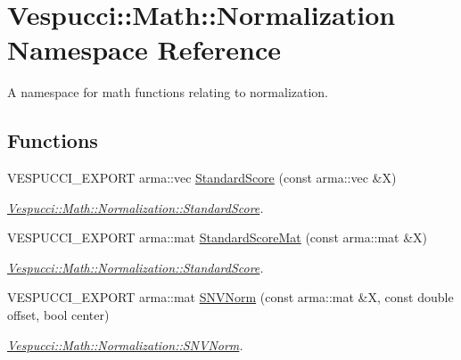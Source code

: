 \hypertarget{namespace_vespucci_1_1_math_1_1_normalization}{}\section{Vespucci\+:\+:Math\+:\+:Normalization Namespace Reference}
\label{namespace_vespucci_1_1_math_1_1_normalization}


A namespace for math functions relating to normalization.  


\subsection*{Functions}
\begin{DoxyCompactItemize}
\item 
V\+E\+S\+P\+U\+C\+C\+I\+\_\+\+E\+X\+P\+O\+RT arma\+::vec \hyperlink{namespace_vespucci_1_1_math_1_1_normalization_a8a39e3540561860b69ec95d8d33bfac0}{Standard\+Score} (const arma\+::vec \&X)
\begin{DoxyCompactList}\small\item\em \hyperlink{namespace_vespucci_1_1_math_1_1_normalization_a8a39e3540561860b69ec95d8d33bfac0}{Vespucci\+::\+Math\+::\+Normalization\+::\+Standard\+Score}. \end{DoxyCompactList}\item 
V\+E\+S\+P\+U\+C\+C\+I\+\_\+\+E\+X\+P\+O\+RT arma\+::mat \hyperlink{namespace_vespucci_1_1_math_1_1_normalization_a00d08eef3567d3420e40dda235c38590}{Standard\+Score\+Mat} (const arma\+::mat \&X)
\begin{DoxyCompactList}\small\item\em \hyperlink{namespace_vespucci_1_1_math_1_1_normalization_a8a39e3540561860b69ec95d8d33bfac0}{Vespucci\+::\+Math\+::\+Normalization\+::\+Standard\+Score}. \end{DoxyCompactList}\item 
V\+E\+S\+P\+U\+C\+C\+I\+\_\+\+E\+X\+P\+O\+RT arma\+::mat \hyperlink{namespace_vespucci_1_1_math_1_1_normalization_a52f2f734da0b1d62656eade3453fb9c5}{S\+N\+V\+Norm} (const arma\+::mat \&X, const double offset, bool center)
\begin{DoxyCompactList}\small\item\em \hyperlink{namespace_vespucci_1_1_math_1_1_normalization_a52f2f734da0b1d62656eade3453fb9c5}{Vespucci\+::\+Math\+::\+Normalization\+::\+S\+N\+V\+Norm}. \end{DoxyCompactList}\end{DoxyCompactItemize}


